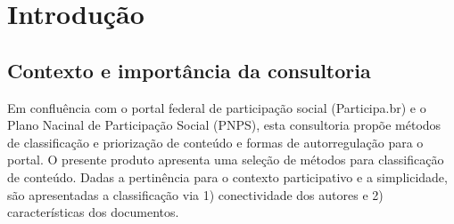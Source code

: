 \documentclass[12pt]{article}
\newcommand{\PalavrasChave}{reconhecimento de padrões, redes complexas, processamento de linguagem natural, participação social}
\begin{document}



\tableofcontents
\newpage


\begin{abstract}
Este documento descreve procedimentos selecionados para categorização de conteúdo do portal federal de participação social (Participa.br). O produto relacionado no termo de referência desta consultoria preve propostas de especificações e códigos. Dado o aspecto prático do trabalho, estão descritas também implementações e códigos operantes multiplataforma (linux/mac/windows). Parte deste trabalho é acessível online via HTTP, como os scripts no IPython Notebook e o endpoint SparQL que serve os dados do Participa.br por critérios semânticos.\\

{\bf Palavras-chave:} \PalavrasChave.
\end{abstract}
\newpage

\section{Introdução}
\subsection{Contexto e importância da consultoria}
Em confluência com o portal federal de participação social (Participa.br) e o Plano Nacinal de Participação Social (PNPS), esta consultoria propõe métodos de classificação e priorização de conteúdo e formas de autorregulação para o portal. O presente produto apresenta uma seleção de métodos para classificação de conteúdo. Dadas a pertinência para o contexto participativo e a simplicidade, são apresentadas a classificação via 1) conectividade dos autores e 2) características dos documentos.
\end{document}
